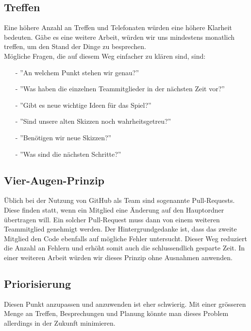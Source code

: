 \subsection*{Treffen}
Eine höhere Anzahl an Treffen und Telefonaten würden eine höhere Klarheit bedeuten. Gäbe es eine weitere Arbeit, würden wir uns mindestens monatlich treffen, um den Stand der Dinge zu besprechen.\\
Mögliche Fragen, die auf diesem Weg einfacher zu klären sind, sind:
\begin{itemize}
    \item[-] ''An welchem Punkt stehen wir genau?''
    \item[-] ''Was haben die einzelnen Teammitglieder in der nächsten Zeit vor?''
    \item[-] ''Gibt es neue wichtige Ideen für das Spiel?''
    \item[-] ''Sind unsere alten Skizzen noch wahrheitsgetreu?''
    \item[-] ''Benötigen wir neue Skizzen?''
    \item[-] ''Was sind die nächsten Schritte?''
\end{itemize}


\subsection*{Vier-Augen-Prinzip}
Üblich bei der Nutzung von GitHub als Team sind sogenannte Pull-Requests. Diese finden statt, wenn ein Mitglied eine Änderung auf den Hauptordner übertragen will. Ein solcher
Pull-Request muss dann von einem weiteren Teammitglied genehmigt werden. Der Hintergrundgedanke ist, dass das zweite Mitglied den Code ebenfalls auf mögliche Fehler untersucht.
Dieser Weg reduziert die Anzahl an Fehlern und erhöht somit auch die schlussendlich gesparte Zeit. In einer weiteren Arbeit würden wir dieses Prinzip ohne Ausnahmen anwenden.


\subsection*{Priorisierung}
Diesen Punkt anzupassen und anzuwenden ist eher schwierig. Mit einer grösseren Menge an Treffen, Besprechungen und Planung könnte man dieses Problem allerdings in der Zukunft
minimieren.


